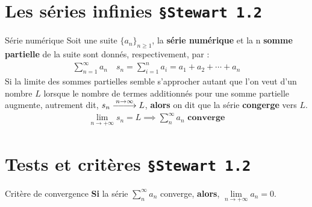 \documentclass[16pt]{report}
\DeclareRobustCommand{\looongrightarrow}{%
  \DOTSB\relbar\joinrel\relbar\joinrel\relbar\joinrel\rightarrow
}
\begin{document}
\begin{multicols*}{2}
    \section{Les séries infinies \texttt{\S Stewart 1.2}}

    \begin{Definitionx}{Série numérique}{}
        Soit une suite $\{a_n\}_{n\geq 1}$, la 
        \textbf{série numérique} et la 
        n \textbf{somme partielle} de la suite sont donnés, 
        respectivement, par : 
        \begin{align*}
            \sum_{n=1}^{\infty }a_n \quad s_n = 
            \sum_{i=1}^{n} a_i = 
            a_1 + a_2 + \cdots + a_n 
        \end{align*}
        Si la limite des sommes partielles semble s'approcher 
        autant que l'on veut 
        d'un nombre $L$ lorsque le nombre de termes additionnés 
        pour une somme partielle augmente, 
        autrement dit, 
        $s_n \stackrel{n \to \infty}{\looongrightarrow} L$, 
        \textbf{alors} on dit que 
        la série \textbf{congerge} vers $L$.   
        \begin{align*}
            \lim\limits_{n\to+\infty}s_n  = L 
            \implies \sum_{n}^{\infty}a_n \textbf{ converge}  
        \end{align*}
    \end{Definitionx}

    \section{Tests et critères \texttt{\S Stewart 1.2}}
    \begin{Theorem}{Critère de convergence}{}
        \textbf{Si} la série $\sum_{n}^{\infty}a_n$ converge, \textbf{alors}, 
        $\lim\limits_{n\to+\infty}a_n  = 0$.  
    \end{Theorem}


\end{multicols*}
\end{document}
